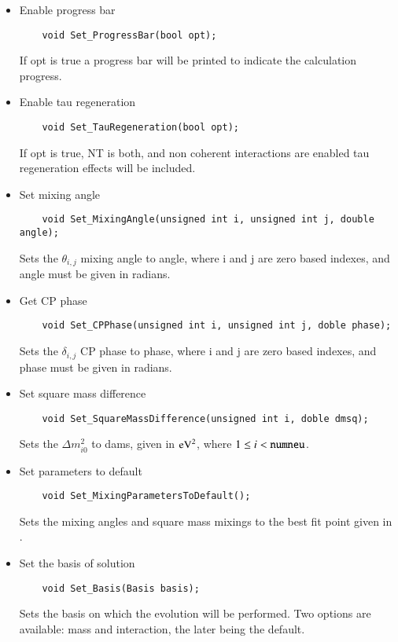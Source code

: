 \begin{itemize}
  {\ttf enu} has to be in natural units.
  \item Enable progress bar
  \begin{lstlisting}
    void Set_ProgressBar(bool opt);
  \end{lstlisting}
  If {\ttf opt} is {\ttf true} a progress bar will be printed to indicate the calculation progress.
  \item Enable tau regeneration
  \begin{lstlisting}
    void Set_TauRegeneration(bool opt);
  \end{lstlisting}
  If {\ttf opt} is {\ttf true}, {\ttf NT} is {\ttf both}, and non coherent interactions are enabled 
  tau regeneration effects will be included.
  \item Set mixing angle
  \begin{lstlisting}
    void Set_MixingAngle(unsigned int i, unsigned int j, double angle);
  \end{lstlisting}
  Sets the $\theta_{i,j}$ mixing angle to {\ttf angle}, where {\ttf i} and {\ttf j} are zero based indexes, and
  {\ttf angle} must be given in radians.
  \item Get CP phase
  \begin{lstlisting}
    void Set_CPPhase(unsigned int i, unsigned int j, doble phase);
  \end{lstlisting}
  Sets the $\delta_{i,j}$ CP phase to {\ttf phase}, where {\ttf i} and {\ttf j} are zero based indexes, and
  {\ttf phase} must be given in radians.
  \item Set square mass difference
  \begin{lstlisting}
    void Set_SquareMassDifference(unsigned int i, doble dmsq);
  \end{lstlisting}
  Sets the $\Delta m^2_{i0}$ to {\ttf dams}, given in ${\rm eV}^2$, where $1\le i < {\rm \tt numneu}$.
  \item Set parameters to default
  \begin{lstlisting}
    void Set_MixingParametersToDefault();
  \end{lstlisting}
  Sets the mixing angles and square mass mixings to the best fit point given in \citep{Gonzalez-Garcia:2014bfa}.
  \item Set the basis of solution
  \begin{lstlisting}
    void Set_Basis(Basis basis);
  \end{lstlisting}
  Sets the basis on which the evolution will be performed. Two options are available: {\ttf mass} and {\ttf interaction}, the 
  later being the default.
  \end{itemize}
  
